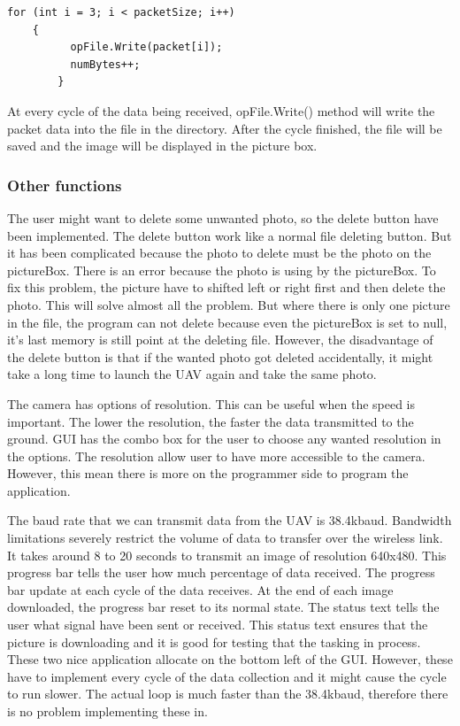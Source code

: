 \documentclass[oneside]{ecsgdp}         %
\begin{document}
\begin{lstlisting}[caption={writing binary file},label=lst:writingb]          
	for (int i = 3; i < packetSize; i++)
	{
          opFile.Write(packet[i]);
          numBytes++;
    	}
\end{lstlisting}         

       At every cycle of the data being received, opFile.Write() method will write the packet data into the file in the directory. After the cycle finished, the file will be saved and the image will be displayed in the picture box. 
    
    
\subsubsection*{Other functions}
The user might want to delete some unwanted photo, so the delete button have been implemented. The delete button work like a normal file deleting button. But it has been complicated because the photo to delete must be the photo on the pictureBox. There is an error because the photo is using by the pictureBox. To fix this problem, the picture have to shifted left or right first and then delete the photo. This will solve almost all the problem. But where there is only one picture in the file, the program can not delete because even the pictureBox is set to null, it's last memory is still point at the deleting file. However, the disadvantage of the delete button is that if the wanted photo got deleted accidentally, it might take a long time to launch the UAV again and take the same photo.

The camera has options of resolution. This can be useful when the speed is important. The lower the resolution, the faster the data transmitted to the ground. GUI has the combo box for the user to choose any wanted resolution in the options. The resolution allow user to have more accessible to the camera. However, this mean there is more on the programmer side to program the application.

The baud rate that we can transmit data from the UAV is 38.4kbaud. Bandwidth limitations severely restrict the volume of data to transfer over the wireless link. It takes around 8 to 20 seconds to transmit an image of resolution 640x480. This progress bar tells the user how much percentage of data received. The progress bar update at each cycle of the data receives. At the end of each image downloaded, the progress bar reset to its normal state.  The status text tells the user what signal have been sent or received. This status text ensures that the picture is downloading and it is good for testing that the tasking in process. These two nice application allocate on the bottom left of the GUI. However, these have to implement every cycle of the data collection and it might cause the cycle to run slower. The actual loop is much faster than the 38.4kbaud, therefore there is no problem implementing these in.
\end{document}
